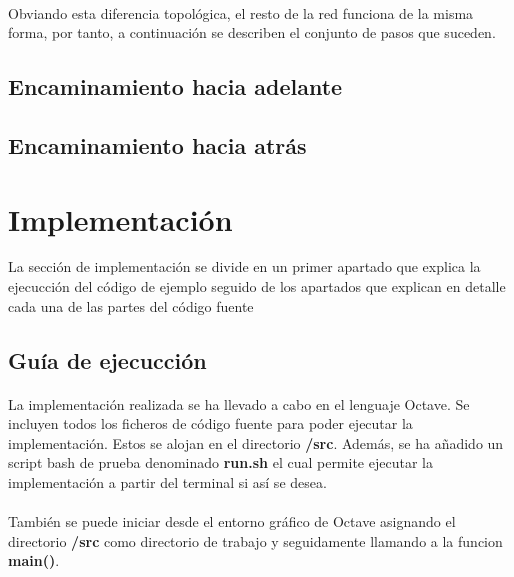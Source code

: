 \documentclass[10pt, a4paper,spanish]{article}
\begin{document}
		\paragraph{}
		Obviando esta diferencia topológica, el resto de la red funciona de la misma forma, por tanto, a continuación se describen el conjunto de pasos que suceden.

		\subsection{Encaminamiento hacia adelante}

			\paragraph{}

		\subsection{Encaminamiento hacia atrás}

			\paragraph{}


	\section{Implementación}

		La sección de implementación se divide en un primer apartado que explica la ejecucción del código de ejemplo seguido de los apartados que explican en detalle cada una de las partes del código fuente


		\subsection{Guía de ejecucción}

			\paragraph{}
			La implementación realizada se ha llevado a cabo en el lenguaje Octave. Se incluyen todos los ficheros de código fuente para poder ejecutar la implementación. Estos se alojan en el directorio \textbf{/src}. Además, se ha añadido un script bash de prueba denominado \textbf{run.sh} el cual permite ejecutar la implementación a partir del terminal si así se desea.

			\paragraph{}
			También se puede iniciar desde el entorno gráfico de Octave asignando el directorio \textbf{/src} como directorio de trabajo y seguidamente llamando a la funcion \textbf{main()}.
\end{document}
